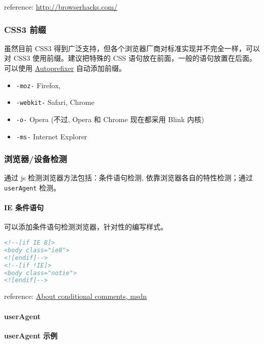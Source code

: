 reference: \url{http://browserhacks.com/}

\subsubsection{CSS3 前缀}\label{css3-ux524dux7f00}

虽然目前 CSS3
得到广泛支持，但各个浏览器厂商对标准实现并不完全一样，可以对 CSS3
使用前缀。建议把特殊的 CSS 语句放在前面，一般的语句放置在后面。可以使用
\href{https://github.com/search?utf8=\%E2\%9C\%93\&q=Autoprefixer}{Autoprefixer}
自动添加前缀。

\begin{itemize}
\tightlist
\item
  \lstinline!-moz-! Firefox,
\item
  \lstinline!-webkit-! Safari, Chrome
\item
  \lstinline!-o-! Opera (不过, Opera 和 Chrome 现在都采用 Blink 内核)
\item
  \lstinline!-ms-! Internet Explorer
\end{itemize}

\subsubsection{浏览器/设备检测}\label{ux6d4fux89c8ux5668ux8bbeux5907ux68c0ux6d4b}

通过 js 检测浏览器方法包括：条件语句检测, 依靠浏览器各自的特性检测；通过
\lstinline!userAgent! 检测。

\paragraph{IE 条件语句}\label{ie-ux6761ux4ef6ux8bedux53e5}

可以添加条件语句检测浏览器，针对性的编写样式。

\begin{lstlisting}[language=HTML]
<!--[if IE 8]>
<body class="ie8">
<![endif]-->
<!--[if !IE]>
<body class="notie">
<![endif]-->
\end{lstlisting}

reference:
\href{https://msdn.microsoft.com/en-us/library/ms537512(v=vs.85).aspx}{About
conditional comments, msdn}

\paragraph{userAgent}\label{useragent}

\textbf{userAgent 示例}

